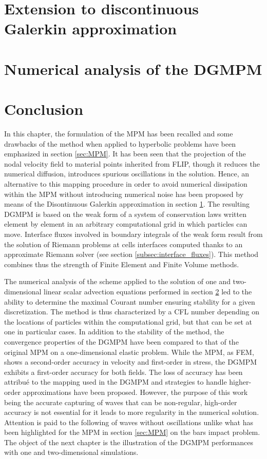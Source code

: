 \section{Extension to discontinuous Galerkin approximation}
\label{sec:DGMPM}


\section{Numerical analysis of the DGMPM}
\label{sec:DGMPM_analysis}


\section*{Conclusion}
In this chapter, the formulation of the MPM has been recalled and some drawbacks of the method when applied to hyperbolic problems have been emphasized in section \ref{sec:MPM}. It has been seen that the projection of the nodal velocity field to material points inherited from FLIP, though it reduces the numerical diffusion, introduces spurious oscillations in the solution. Hence, an alternative to this mapping procedure in order to avoid numerical dissipation within the MPM without introducing numerical noise has been proposed by means of the Disontinuous Galerkin approximation in section \ref{sec:DGMPM}. The resulting DGMPM is based on the weak form of a system of conservation laws written element by element in an arbitrary computational grid in which particles can move. Interface fluxes involved in boundary integrals of the weak form result from the solution of Riemann problems at cells interfaces computed thanks to an approximate Riemann solver (see section \ref{subsec:interface_fluxes}). This method combines thus the strength of Finite Element and Finite Volume methods.

The numerical analysis of the scheme applied to the solution of one and two-dimensional linear scalar advection equations performed in section \ref{sec:DGMPM_analysis} led to the ability to determine the maximal Courant number ensuring stability for a given discretization. The method is thus characterized by a CFL number depending on the locations of particles within the computational grid, but that can be set at one in particular cases. In addition to the stability of the method, the convergence properties of the DGMPM have been compared to that of the original MPM on a one-dimensional elastic problem. While the MPM, as FEM, shows a second-order accuracy in velocity and first-order in stress, the DGMPM exhibits a first-order accuracy for both fields. The loss of accuracy has been attribué to the mapping used in the DGMPM and strategies to handle higher-order approximations have been proposed. However, the purpose of this work being the accurate capturing of waves that can be non-regular, high-order accuracy is not essential for it leads to more regularity in the numerical solution. Attention is paid to the following of waves without oscillations unlike what has been highlighted for the MPM in section \ref{sec:MPM} on the bars impact problem. The object of the next chapter is the illustration of the DGMPM performances with one and two-dimensional simulations.




